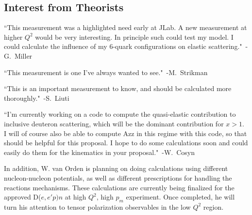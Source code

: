 \subsection{Interest from Theorists}

``This measurement was a highlighted need early at JLab. A new measurement at higher $Q^2$ would be very interesting. In principle such could test my model. I could calculate the influence of my 6-quark configurations on elastic scattering."~-G.~Miller

``This measurement is one I've always wanted to see."~-M.~Strikman

``This is an important measurement to know, and should be calculated more thoroughly."~-S.~Liuti

``I'm currently working on a code to compute the quasi-elastic  contribution to inclusive deuteron scattering, which will be the dominant contribution for $x > 1$.  I will of course also be able to compute Azz in this regime with this 
code, so that should be helpful for this proposal. I hope to do some 
calculations soon and could easily do them for the kinematics in your 
proposal."~-W.~Cosyn


In addition, W. van Orden is planning on doing calculations using different nucleon-nucleon potentials, as well as different prescriptions for handling the reactions mechanisms.   These calculations are currently being finalized for the approved
D($e,e'p)n$ at high $Q^2$, high $p_m$ experiment. Once completed, he will turn his attention to tensor polarization observables in the low $Q^2$ region.